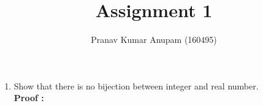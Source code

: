\documentclass[a4paper,11pt]{article}
\title{Assignment 1}
\author{Pranav Kumar Anupam (160495)}
\begin{document}
\maketitle
\begin{enumerate}
\item Show that there is no bijection between integer and real number.\\ \textbf{Proof :} 
\end{enumerate}
\end{document}

